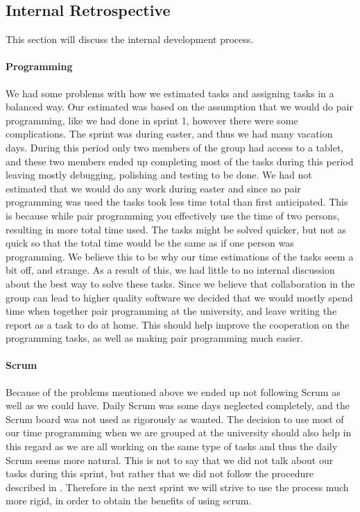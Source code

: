 \subsection{Internal Retrospective}\label{internal2}
This section will discuss the internal development process.
\paragraph{Programming}
We had some problems with how we estimated tasks and assigning tasks in a balanced way.
Our estimated was based on the assumption that we would do pair programming, like we had done in sprint 1, however there were some complications. 
The sprint was during easter, and thus we had many vacation days.
During this period only two members of the group had access to a tablet, and these two members ended up completing most of the tasks during this period leaving mostly debugging, polishing and testing to be done.
We had not estimated that we would do any work during easter and since no pair programming was used the tasks took less time total than first anticipated.
This is because while pair programming you effectively use the time of two persons, resulting in more total time used. 
The tasks might be solved quicker, but not as quick so that the total time would be the same as if one person was programming.
We believe this to be why our time estimations of the tasks seem a bit off, and strange.
As a result of this, we had little to no internal discussion about the best way to solve these tasks. 
Since we believe that collaboration in the group can lead to higher quality software we decided that we would mostly spend time when together pair programming at the university, and leave writing the report as a task to do at home. 
This should help improve the cooperation on the programming tasks, as well as making pair programming much easier.

\paragraph{Scrum}
Because of the problems mentioned above we ended up not following Scrum as well as we could have.
Daily Scrum was some days neglected completely, and the Scrum board was not used as rigorously as wanted.
The decision to use most of our time programming when we are grouped at the university should also help in this regard as we are all working on the same type of tasks and thus the daily Scrum seems more natural.
This is not to say that we did not talk about our tasks during this sprint, but rather that we did not follow the procedure described in .
Therefore in the next sprint we will strive to use the process much more rigid, in order to obtain the benefits of using scrum.
